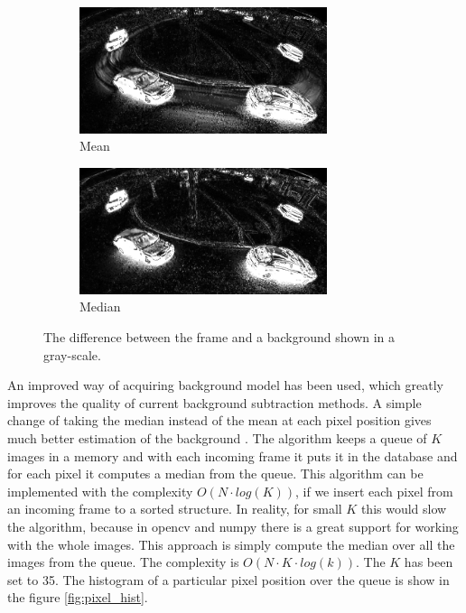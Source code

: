 \documentclass[a4paper,12pt,titlepage]{article}
\numberwithin{figure}{section}
\begin{document}
\begin{figure}
    \begin{subfigure}[Sample1]{0.5\linewidth}
        \includegraphics[height=37mm]{fig/threshold_mean_crop.png}
        \caption{Mean}
        \label{fig:threshold_mean}
    \end{subfigure}
    \qquad
    \begin{subfigure}[Sample1]{0.5\linewidth}    
        \includegraphics[height=37mm]{fig/threshold_med_crop.png}
        \caption{Median}
        \label{fig:threshold_med}    
    \end{subfigure} 
    \caption{The difference between the frame and a background shown in a gray-scale.}
\end{figure}

An improved way of acquiring background model has been used, which greatly improves the quality of current background subtraction methods. A simple change of taking the median instead of the mean at each pixel position gives much better estimation of the background \cite{bgs-med1, bgs-med2}. The algorithm keeps a queue of $K$ images in a memory and with each incoming frame it puts it in the database and for each pixel it computes a median from the queue. This algorithm can be implemented with the complexity $O(N \cdot log(K))$, if we insert each pixel from an incoming frame to a sorted structure. In reality, for small $K$ this would slow the algorithm, because in opencv and numpy there is a great support for working with the whole images. This approach is simply compute the median over all the images from the queue. The complexity is $O(N \cdot K \cdot log(k)).$ The $K$ has been set to 35. The histogram of a particular pixel position over the queue is show in the figure \ref{fig:pixel_hist}.
\end{document}
